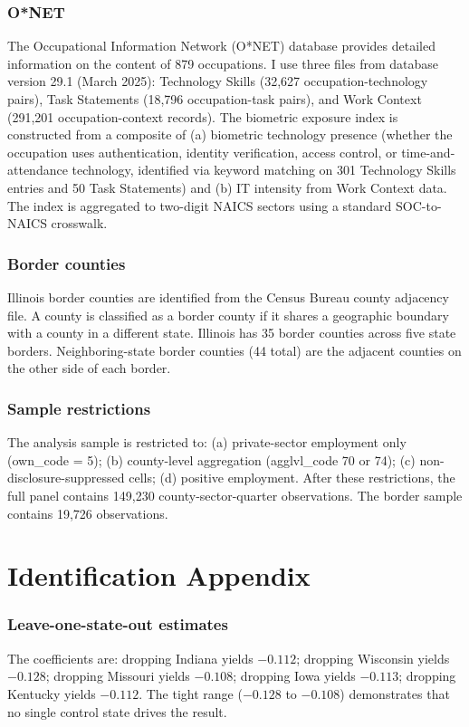 \documentclass[12pt]{article}
\begin{document}
\subsubsection*{O*NET} The Occupational Information Network (O*NET) database provides detailed information on the content of 879 occupations. I use three files from database version 29.1 (March 2025): Technology Skills (32,627 occupation-technology pairs), Task Statements (18,796 occupation-task pairs), and Work Context (291,201 occupation-context records). The biometric exposure index is constructed from a composite of (a) biometric technology presence (whether the occupation uses authentication, identity verification, access control, or time-and-attendance technology, identified via keyword matching on 301 Technology Skills entries and 50 Task Statements) and (b) IT intensity from Work Context data. The index is aggregated to two-digit NAICS sectors using a standard SOC-to-NAICS crosswalk.

\subsubsection*{Border counties} Illinois border counties are identified from the Census Bureau county adjacency file. A county is classified as a border county if it shares a geographic boundary with a county in a different state. Illinois has 35 border counties across five state borders. Neighboring-state border counties (44 total) are the adjacent counties on the other side of each border.

\subsubsection*{Sample restrictions} The analysis sample is restricted to: (a) private-sector employment only (own\_code = 5); (b) county-level aggregation (agglvl\_code 70 or 74); (c) non-disclosure-suppressed cells; (d) positive employment. After these restrictions, the full panel contains 149,230 county-sector-quarter observations. The border sample contains 19,726 observations.

\section{Identification Appendix}
\label{sec:id_appendix}

\subsubsection*{Leave-one-state-out estimates} The coefficients are: dropping Indiana yields $-0.112$; dropping Wisconsin yields $-0.128$; dropping Missouri yields $-0.108$; dropping Iowa yields $-0.113$; dropping Kentucky yields $-0.112$. The tight range ($-0.128$ to $-0.108$) demonstrates that no single control state drives the result.
\end{document}

